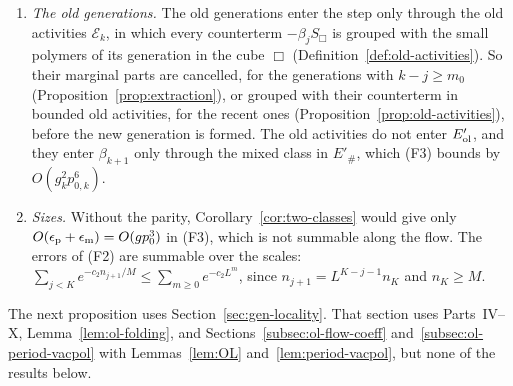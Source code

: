 \begin{remark}[On (F1)--(F3)]\label{rem:flow-F}
\begin{enumerate}[label=(\alph*)]
\item \emph{The old generations.} The old generations enter the step only through the old activities $\mathcal E_k$, in which every counterterm $-\beta_jS_\Box$ is grouped with the small polymers of its generation in the cube $\Box$ (Definition~\ref{def:old-activities}). So their marginal parts are cancelled, for the generations with $k-j\ge m_0$ (Proposition~\ref{prop:extraction}), or grouped with their counterterm in bounded old activities, for the recent ones (Proposition~\ref{prop:old-activities}), before the new generation is formed. The old activities do not enter $E'_{\rm ol}$, and they enter $\beta_{k+1}$ only through the mixed class in $E'_\#$, which (F3) bounds by $O(g_k^2p_{0,k}^6)$.
\item \emph{Sizes.} Without the parity, Corollary~\ref{cor:two-classes} would give only $O(\epsilon_{\rm p}+\epsilon_{\rm m})=O(gp_0^3)$ in (F3), which is not summable along the flow. The errors of (F2) are summable over the scales: $\sum_{j<K}e^{-c_2n_{j+1}/M}\le\sum_{m\ge0}e^{-c_2L^m}$, since $n_{j+1}=L^{K-j-1}n_K$ and $n_K\ge M$.
\end{enumerate}
\end{remark}

The next proposition uses Section~\ref{sec:gen-locality}. That section uses Parts~IV--X, Lemma~\ref{lem:ol-folding}, and Sections~\ref{subsec:ol-flow-coeff} and~\ref{subsec:ol-period-vacpol} with Lemmas~\ref{lem:OL} and~\ref{lem:period-vacpol}, but none of the results below.

